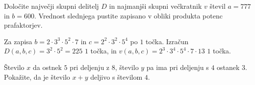 \documentclass[addpoints]{exam}
\begin{document}
\begin{questions}




    \question[4]
    Določite največji skupni delitelj $D$ in najmanjši skupni večkratnik $v$ števil $a=777$ in $b=600$.
    Vrednost slednjega pustite zapisano v obliki produkta potenc prafaktorjev.

    \begin{solution}[9cm]
        Za zapisa $b=2\cdot 3^3\cdot 5^2\cdot 7$ in $c=2^2\cdot 3^2\cdot 5^4$ po $1$ točka. 
        Izračun $D(a,b,c)=3^2\cdot 5^2=225$ $1$ točka, in $v(a,b,c)=2^3\cdot 3^4\cdot 5^4\cdot 7\cdot 13$ $1$ točka.
    \end{solution}
    
    


    \question[3]
    Število $x$ da ostnek $5$ pri deljenju z $8$, število $y$ pa ima pri deljenju s $4$ ostanek $3$. 
    Pokažite, da je število $x+y$ deljivo s številom $4$.

    
    \begin{solution}[4cm]

    \end{solution}

        


    
\end{questions}
\end{document}
